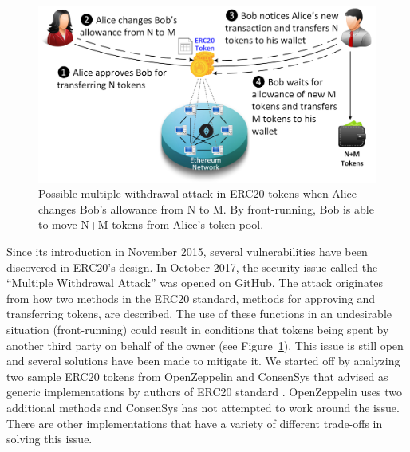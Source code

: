 
\begin{figure}[t!]
	\centering
	\includegraphics[width=1.0\linewidth]{figures/multiple_withdrawal_02.png}
	\caption{Possible multiple withdrawal attack in ERC20 tokens when Alice changes Bob's allowance from N to M. By front-running, Bob is able to move N+M tokens from Alice's token pool.\label{fig:mwa}}
\end{figure}

Since its introduction in November 2015, several vulnerabilities have been discovered in ERC20's design. In October 2017, the security issue called the ``Multiple Withdrawal Attack'' was opened on GitHub\cite{Ref13,Ref07}. The attack originates from how two methods in the ERC20 standard, methods for approving and transferring tokens, are described. The use of these functions in an undesirable situation (\eg front-running) could result in conditions that tokens being spent by another third party on behalf of the owner (see Figure~\ref{fig:mwa}). This issue is still open and several solutions have been made to mitigate it. We started off by analyzing two sample ERC20 tokens from OpenZeppelin\cite{Ref10} and ConsenSys\cite{Ref11} that advised as generic implementations by authors of ERC20 standard \cite{Ref08}. OpenZeppelin uses two additional methods and ConsenSys has not attempted to work around the issue. There are other implementations that have a variety of different trade-offs in solving this issue. 

